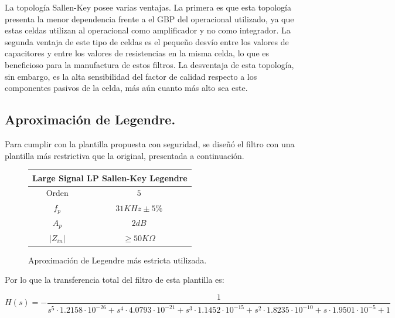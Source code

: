 La topología Sallen-Key posee varias ventajas. La primera es que esta topología presenta la menor dependencia frente a el GBP del operacional utilizado, ya que estas celdas utilizan al operacional como amplificador y no como integrador. La segunda ventaja de este tipo de celdas es el pequeño desvío entre los valores de capacitores y entre los valores de resistencias en la misma celda, lo que es beneficioso para la manufactura de estos filtros. La desventaja de esta topología, sin embargo, es la alta sensibilidad del factor de calidad respecto a los componentes pasivos de la celda, más aún cuanto más alto sea este. 

\subsection{Aproximación de Legendre.}

Para cumplir con la plantilla propuesta con seguridad, se diseñó el filtro con una plantilla más restrictiva que la original, presentada a continuación.

\begin{figure}[H]
		\begin{table}[H]
			\centering
			\begin{tabular}{@{}cc@{}}
			\toprule
			\multicolumn{2}{c}{Large Signal LP Sallen-Key Legendre} \\ \midrule
			Orden & $5$ \\
			$f_p$ & $31KHz \pm 5\%$ \\
			$A_p$ & $2dB$ \\
			$\left| Z_{in}\right|$ & $\geq 50K\Omega$ \\ \bottomrule
			\end{tabular}
		\end{table}
		\caption{Aproximación de Legendre más estricta utilizada.}
		\label{aprox_leg_est}
\end{figure}

Por lo que la transferencia total del filtro de esta plantilla es:

\begin{equation}
H(s) = -\frac{1}{s^5\cdot 1.2158\cdot10^{-26}+s^4\cdot 4.0793\cdot10^{-21}+s^3\cdot 1.1452\cdot10^{-15}+s^2\cdot 1.8235\cdot10^{-10}+s \cdot 1.9501\cdot10^{-5}+1}	
\label{hslegteo}
\end{equation}


